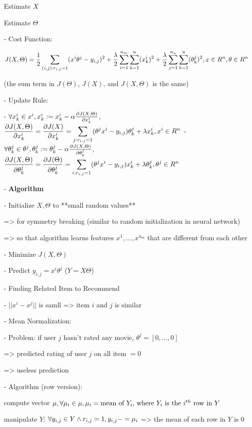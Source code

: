 	Estimate $X$ 

	Estimate $\Theta$ 

- Cost Function: 

$\displaystyle J(X,\Theta) = \frac 1 2 \sum_{(i,j):r_{i,j}=1}(x^i\theta^j - y_{i,j})^2 + \frac \lambda 2 \sum_{i=1}^{n_m}\sum_{k=1}^n(x_k^i)^2 + \frac \lambda 2 \sum_{j=1}^{n_u}\sum_{k=1}^n (\theta_k^j)^2, \space x \in R^n, \space \theta \in R^n$ 

(the sum term in $J(\Theta)$, $J(X)$, and $J(X,\Theta)$ is the same)

- Update Rule: 

- $\forall x^i_k \in x^i, x^i_k := x^i_k-\alpha\large\frac{\partial J(X,\Theta)}{\partial x^i_k}$, $\displaystyle \frac{\partial J(X,\Theta)}{\partial x^i_k} = \frac{\partial J(X)}{\partial x^i_k} =\sum_{j:r_{i,j}=1}(\theta^jx^i-y_{i,j})\theta_k^j+ \lambda x_k^i, \space x^i \in R^n$ 
- $\forall \theta^j_k \in \theta^j, \theta^j_k := \theta^j_k-\alpha\large\frac{\partial J(X,\Theta)}{\partial\theta^j_k}$, $\displaystyle \frac{\partial J(X,\Theta)}{\partial\theta^j_k} = \frac{\partial J(\Theta)}{\partial\theta^j_k} = \sum_{i:r_{i,j}=1}(\theta^jx^i-y_{i,j})x_k^i+ \lambda \theta_k^j, \space \theta^j \in R^n$ 

- \textbf{Algorithm}

- Initialize $X, \Theta$ to **small random values**

=> for symmetry breaking (similar to random initialization in neural network) 

=> so that algorithm learns features $x^1,...,x^{n_m}$ that are different from each other

- Minimize $J(X,\Theta)$ 

- Predict $y_{i,j} = x^i\theta^j$ ($Y = X\Theta$)

- Finding Related Item to Recommend

- $||x^i-x^j||$ is samll => item $i$ and $j$ is similar

- Mean Normalization:

- Problem: if user $j$ hasn't rated any movie, $\theta^j = [0,...,0]$  

=> predicted rating of user $j$ on all item $=0$ 

=> useless prediction

- Algorithm (row version):

	compute vector $\mu, \space \forall \mu_i \in \mu, \mu_i = \text{mean of $Y_i$, where $Y_i$ is the $i^{th}$ row in $Y$}$ 

	manipulate $Y$: $\forall y_{i,j} \in Y \land r_{i,j}=1, \space y_{i,j} -= \mu_i$  => the mean of each row in $Y$ is $0$ 

